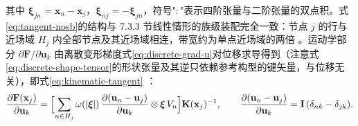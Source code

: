 其中 $\boldsymbol{\xi}_{jn}=\mathbf{x}_{n}-\mathbf{x}_{j}$，$\boldsymbol{\xi}_{nj}=-\boldsymbol{\xi}_{jn}$，符号"$:$"表示四阶张量与二阶张量的双点积。式\eqref{eq:tangent-nosb}的结构与 7.3.3 节线性情形的族级装配完全一致：节点 $j$ 的行与近场域 $H_{j}$ 内全部节点及其近场域相连，带宽约为单点近场域的两倍 \cite{Hashim2020,Breitenfeld2014}。运动学部分 $\partial\mathbf{F}/\partial\mathbf{u}_{k}$ 由离散变形梯度式\eqref{eq:discrete-grad-u}对位移求导得到（注意式\eqref{eq:discrete-shape-tensor}的形状张量及其逆只依赖参考构型的键矢量，与位移无关），即式\eqref{eq:kinematic-tangent} \cite{Hashim2020}：
\begin{equation}
  \frac{\partial\mathbf{F}(\mathbf{x}_{j})}{\partial\mathbf{u}_{k}}
  =\Bigl[\sum_{n\in H_{j}}\omega(|\boldsymbol{\xi}|)\,
    \frac{\partial(\mathbf{u}_{n}-\mathbf{u}_{j})}{\partial\mathbf{u}_{k}}\otimes\boldsymbol{\xi}\,V_{n}\Bigr]\mathbf{K}(\mathbf{x}_{j})^{-1},
  \qquad
  \frac{\partial(\mathbf{u}_{n}-\mathbf{u}_{j})}{\partial\mathbf{u}_{k}}=\mathbf{I}\,(\delta_{nk}-\delta_{jk}).
  \label{eq:kinematic-tangent}
\end{equation}


